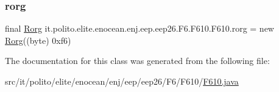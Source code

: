 \subsubsection{\texorpdfstring{rorg}{rorg}}
{\footnotesize\ttfamily final \hyperlink{classit_1_1polito_1_1elite_1_1enocean_1_1enj_1_1eep_1_1_rorg}{Rorg} it.\+polito.\+elite.\+enocean.\+enj.\+eep.\+eep26.\+F6.\+F610.\+F610.\+rorg = new \hyperlink{classit_1_1polito_1_1elite_1_1enocean_1_1enj_1_1eep_1_1_rorg}{Rorg}((byte) 0xf6)\hspace{0.3cm}{\ttfamily [static]}}



The documentation for this class was generated from the following file\+:\begin{DoxyCompactItemize}
\item 
src/it/polito/elite/enocean/enj/eep/eep26/\+F6/\+F610/\hyperlink{_f610_8java}{F610.\+java}\end{DoxyCompactItemize}
